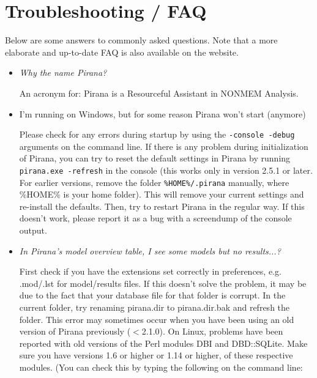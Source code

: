 {{{{\newpage

\section{Troubleshooting / FAQ}

Below are some answers to commonly asked questions. Note that a more
elaborate and up-to-date FAQ is also available on the website.

\begin{itemize}

\item \textit{Why the name Pirana?}

  \vspace{5pt} An acronym for: Pirana is a Resourceful Assistant in NONMEM Analysis.

\item {I'm running on Windows, but for some reason Pirana won't start (anymore)}

\vspace{5pt} Please check for any errors during startup by using the {\tt -console -debug} arguments on the command line. If there is any problem during initialization of Pirana, you can try to reset the default settings in Pirana by running {\tt pirana.exe -refresh} in the console (this works only in version 2.5.1 or later. For earlier versions, remove the folder {\tt \%HOME\%/.pirana} manually, where \%HOME\% is your home folder). This will remove your current settings and re-install the defaults. Then, try to restart Pirana in the regular way. If this doesn't work, please report it as a bug with a screendump of the console output.

\item \textit{ In Pirana's model overview table, I see some models but
    no results...?}

  \vspace{5pt} First check if you have the extensions set correctly in
  preferences, e.g. .mod/.lst for model/results files. If this doesn't
  solve the problem, it may be due to the fact that your database file
  for that folder is corrupt. In the current folder, try renaming
  pirana.dir to pirana.dir.bak and refresh the folder. This error may
  sometimes occur when you have been using an old version of Pirana
  previously ($<$2.1.0). On Linux, problems have been reported with
  old versions of the Perl modules DBI and DBD::SQLite. Make
  sure you have versions 1.6 or higher or 1.14 or higher, of these
  respective modules. (You can check this by typing the following on
  the command line:


\end{itemize}}}}}
